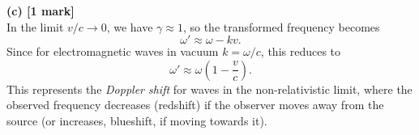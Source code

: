 \documentclass{article}
\begin{document}
\textbf{(c) [1 mark]}\\
In the limit \(v/c\to0\), we have \(\gamma\approx 1\), so the transformed frequency becomes
\[
\omega'\approx\omega - kv.
\]
Since for electromagnetic waves in vacuum \(k=\omega/c\), this reduces to
\[
\omega'\approx\omega\left(1-\frac{v}{c}\right).
\]
This represents the \emph{Doppler shift} for waves in the non-relativistic limit, where the observed frequency decreases (redshift) if the observer moves away from the source (or increases, blueshift, if moving towards it).
\end{document}
